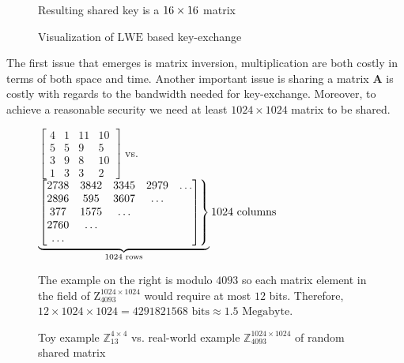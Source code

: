 \begin{figure}[H]
\begin{center}
\end{center}
\caption{Visualization of $\mathrm{LWE}$ based key-exchange}
Resulting shared key is a $16 \times 16$ matrix
\end{figure}


The first issue that emerges is matrix inversion, multiplication are both costly in terms of both space and time. Another important issue is sharing a matrix $\textbf{A}$ is costly with regards to the bandwidth needed for key-exchange. Moreover, to achieve a reasonable security we need at least $1024 \times 1024$ matrix to be shared.

\begin{figure}[H]
\centering
	$\begin{bmatrix} 
		4  & 1  & 11 & 10 \\
		5 & 5 & 9 & 5 \\
		3 & 9 & 8 & 10  \\
		1  & 3 & 3 & 2 
	\end{bmatrix}$
	vs.
    $\underbrace{
    \begin{rcases}
    \begin{bmatrix} 
		2738 & 3842 & 3345 & 2979 & \dots\\
		2896 & 595 & 3607 & \dots \\
		377 & 1575  & \dots \\
        2760 & \dots \\
        \dots
	\end{bmatrix}
    \end{rcases}}_\text{1024 rows}\text{1024 columns}$
	\caption{Toy example $\mathbb{Z}_{13}^{4\times4}$ vs. real-world example $\mathbb{Z}_{4093}^{1024\times1024}$ of random shared matrix}
	{The example on the right is modulo $4093$ so each matrix element in the field of $\mathrm{Z}_{4093}^{1024 \times 1024}$ would require at most $12$ bits. Therefore, $12 \times 1024 \times 1024 = 4291821568 \text{ bits} \approx 1.5 \text{ Megabyte}$}.
\end{figure}

